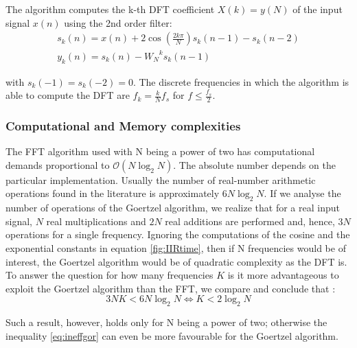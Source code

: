 \documentclass[12pt,a4paper,openright]{article}
\begin{document}
The algorithm computes the k-th DFT coefficient $X(k)=y(N)$ of the input signal $x(n)$ using the 2nd order filter:
\begin{equation}
\begin{array}{l}
{s_k}(n) = x(n) + 2\cos (\frac{{2k\pi }}{N}){s_k}(n - 1) - {s_k}(n - 2)\\
{y_k}(n) = {s_k}(n) - {W_N}^k{s_k}(n - 1)
\end{array}
\label{fig:IIRtime}
\end{equation}

with ${s_k}( - 1) = {s_k}( - 2) = 0$. The discrete frequencies in which the algorithm is able to compute the DFT are ${f_k} = \frac{k}{N}{f_s}$ for $f \leq \frac{f_s}{2}$.

\subsubsection{Computational and Memory complexities}

The FFT algorithm used with N being a power of two has computational demands proportional to $\mathcal{O}(N\log_2 N)$. The absolute number depends on the particular implementation. Usually the number of real-number arithmetic operations found in the literature is approximately $6N \log_2 N$. If we analyse the number of operations of the Goertzel algorithm, we realize that for a real input signal, $N$ real multiplications and $2N$ real additions are performed and, hence, $3N$ operations for a single frequency. Ignoring the computations of the cosine and the exponential constants in equation \ref{fig:IIRtime}, then if N frequencies would be of interest, the Goertzel algorithm would be of quadratic complexity as the DFT is. To answer the question for how many frequencies $K$ is it more advantageous to exploit the Goertzel algorithm than the FFT, we compare and conclude that \cite{GoertzelPaper}: 
\begin{equation}
3NK < 6N{\log _2}N \Leftrightarrow K < 2{\log _2}N
\label{eq:ineffgor}
\end{equation}

Such a result, however, holds only for N being a power of two; otherwise the inequality \ref{eq:ineffgor} can even be more favourable for the Goertzel algorithm.
\end{document}
